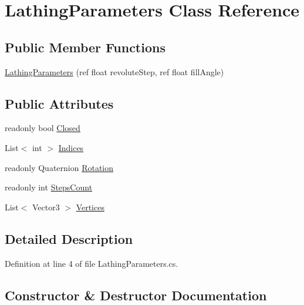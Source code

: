\hypertarget{class_lathing_parameters}{}\section{Lathing\+Parameters Class Reference}
\label{class_lathing_parameters}
\subsection*{Public Member Functions}
\begin{DoxyCompactItemize}
\item 
\mbox{\hyperlink{class_lathing_parameters_ab0a3e48b9088f40d89cc2ca2595849a3}{Lathing\+Parameters}} (ref float revolute\+Step, ref float fill\+Angle)
\end{DoxyCompactItemize}
\subsection*{Public Attributes}
\begin{DoxyCompactItemize}
\item 
readonly bool \mbox{\hyperlink{class_lathing_parameters_a35b9527f47662b6122dacf4be86f8ea2}{Closed}}
\item 
List$<$ int $>$ \mbox{\hyperlink{class_lathing_parameters_a6de58dd4768f3e0e1c8ef0856b28370a}{Indices}}
\item 
readonly Quaternion \mbox{\hyperlink{class_lathing_parameters_a13c433ad2852ca57878eea751fb7c648}{Rotation}}
\item 
readonly int \mbox{\hyperlink{class_lathing_parameters_a374bb79585d4c37fde7a1e362fea7b16}{Steps\+Count}}
\item 
List$<$ Vector3 $>$ \mbox{\hyperlink{class_lathing_parameters_ae967f66a4402bd77573bf9281b8523c2}{Vertices}}
\end{DoxyCompactItemize}


\subsection{Detailed Description}


Definition at line 4 of file Lathing\+Parameters.\+cs.



\subsection{Constructor \& Destructor Documentation}
\mbox{\label{class_lathing_parameters_ab0a3e48b9088f40d89cc2ca2595849a3}} 
